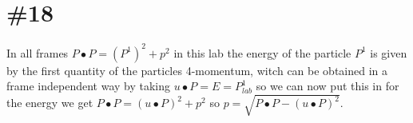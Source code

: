 \documentclass[11pt,a4paper]{article}
\begin{document}
\section{\#18}

In all frames $P\bullet P=(P^1)^2+p^2$ in this lab the energy of the particle $P^1$ is given by the first quantity of the particles 4-momentum, witch can be obtained in a frame independent way by taking $u\bullet P=E=P^1_{lab}$ so we can now put this in for the energy we get $P\bullet P=(u\bullet P)^2 +p^2$ so $p=\sqrt{P\bullet P -(u\bullet P)^2}$.
\end{document}
